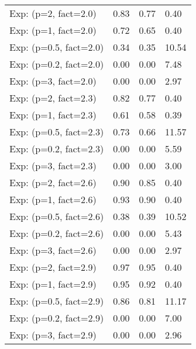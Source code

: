 \begin{table}
\begin{tabular}{llll}
\midrule
Exp: (p=2, fact=2.0)   &   0.83 &   0.77 &   0.40 \\
Exp: (p=1, fact=2.0)   &   0.72 &   0.65 &   0.40 \\
Exp: (p=0.5, fact=2.0) &   0.34 &   0.35 &  10.54 \\
Exp: (p=0.2, fact=2.0) &   0.00 &   0.00 &   7.48 \\
Exp: (p=3, fact=2.0)   &   0.00 &   0.00 &   2.97 \\
\midrule
Exp: (p=2, fact=2.3)   &   0.82 &   0.77 &   0.40 \\
Exp: (p=1, fact=2.3)   &   0.61 &   0.58 &   0.39 \\
Exp: (p=0.5, fact=2.3) &   0.73 &   0.66 &  11.57 \\
Exp: (p=0.2, fact=2.3) &   0.00 &   0.00 &   5.59 \\
Exp: (p=3, fact=2.3)   &   0.00 &   0.00 &   3.00 \\
\midrule
Exp: (p=2, fact=2.6)   &   0.90 &   0.85 &   0.40 \\
Exp: (p=1, fact=2.6)   &   0.93 &   0.90 &   0.40 \\
Exp: (p=0.5, fact=2.6) &   0.38 &   0.39 &  10.52 \\
Exp: (p=0.2, fact=2.6) &   0.00 &   0.00 &   5.43 \\
Exp: (p=3, fact=2.6)   &   0.00 &   0.00 &   2.97 \\
\midrule
Exp: (p=2, fact=2.9)   &   0.97 &   0.95 &   0.40 \\
Exp: (p=1, fact=2.9)   &   0.95 &   0.92 &   0.40 \\
Exp: (p=0.5, fact=2.9) &   0.86 &   0.81 &  11.17 \\
Exp: (p=0.2, fact=2.9) &   0.00 &   0.00 &   7.00 \\
Exp: (p=3, fact=2.9)   &   0.00 &   0.00 &   2.96 \\
\midrule
\bottomrule
\end{tabular}
\end{table}